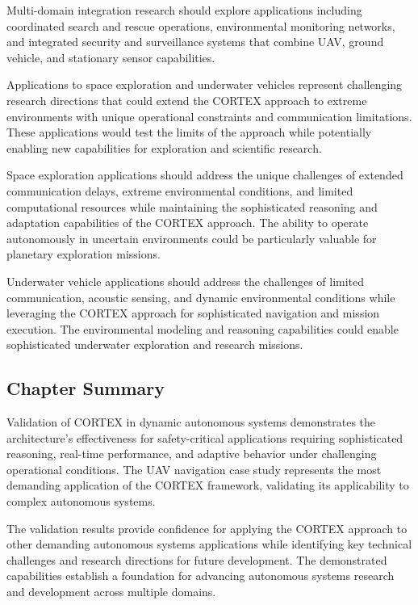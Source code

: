 Multi-domain integration research should explore applications including coordinated search and rescue operations, environmental monitoring networks, and integrated security and surveillance systems that combine UAV, ground vehicle, and stationary sensor capabilities.

Applications to space exploration and underwater vehicles represent challenging research directions that could extend the CORTEX approach to extreme environments with unique operational constraints and communication limitations. These applications would test the limits of the approach while potentially enabling new capabilities for exploration and scientific research.

Space exploration applications should address the unique challenges of extended communication delays, extreme environmental conditions, and limited computational resources while maintaining the sophisticated reasoning and adaptation capabilities of the CORTEX approach. The ability to operate autonomously in uncertain environments could be particularly valuable for planetary exploration missions.

Underwater vehicle applications should address the challenges of limited communication, acoustic sensing, and dynamic environmental conditions while leveraging the CORTEX approach for sophisticated navigation and mission execution. The environmental modeling and reasoning capabilities could enable sophisticated underwater exploration and research missions.

\subsection{Chapter Summary}

Validation of CORTEX in dynamic autonomous systems demonstrates the architecture's effectiveness for safety-critical applications requiring sophisticated reasoning, real-time performance, and adaptive behavior under challenging operational conditions. The UAV navigation case study represents the most demanding application of the CORTEX framework, validating its applicability to complex autonomous systems.

The validation results provide confidence for applying the CORTEX approach to other demanding autonomous systems applications while identifying key technical challenges and research directions for future development. The demonstrated capabilities establish a foundation for advancing autonomous systems research and development across multiple domains.

